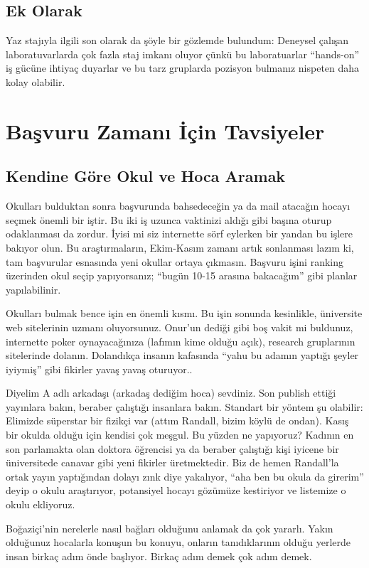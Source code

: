 \documentclass[12pt]{article}
\begin{document}
\subsection{Ek Olarak}
Yaz  stajıyla ilgili son olarak da şöyle bir gözlemde bulundum:  Deneysel çalışan laboratuvarlarda çok fazla staj imkanı oluyor çünkü bu laboratuarlar “hands-on” iş gücüne ihtiyaç duyarlar ve bu tarz gruplarda pozisyon bulmanız nispeten daha kolay olabilir. 
\newpage
%
%
\section{Başvuru Zamanı İçin Tavsiyeler}
%
\subsection{Kendine Göre Okul ve Hoca Aramak}
Okulları bulduktan sonra başvurunda bahsedeceğin ya da mail atacağın hocayı seçmek önemli bir iştir. Bu iki iş uzunca vaktinizi aldığı gibi başına oturup odaklanması da zordur. İyisi mi siz internette sörf eylerken bir yandan bu işlere bakıyor olun. Bu araştırmaların, Ekim-Kasım zamanı artık sonlanması lazım ki, tam başvurular esnasında yeni okullar ortaya çıkmasın. Başvuru işini ranking üzerinden okul seçip yapıyorsanız; “bugün 10-15 arasına bakacağım” gibi planlar yapılabilinir. 

Okulları bulmak bence işin en önemli kısmı. Bu işin sonunda kesinlikle, üniversite web sitelerinin uzmanı oluyorsunuz. Onur'un dediği gibi boş vakit mi buldunuz, internette poker oynayacağınıza (lafımın kime olduğu açık), research gruplarının sitelerinde dolanın. Dolandıkça insanın kafasında ``yahu bu adamın yaptığı şeyler iyiymiş'' gibi fikirler yavaş yavaş oturuyor.. 

Diyelim A adlı arkadaşı (arkadaş dediğim hoca) sevdiniz. Son publish ettiği yayınlara bakın, beraber çalıştığı insanlara bakın. Standart bir yöntem şu olabilir: Elimizde süperstar bir fizikçi var (attım Randall, bizim köylü de ondan). Kasış bir okulda olduğu için kendisi çok meşgul. Bu yüzden ne yapıyoruz? Kadının en son parlamakta olan doktora öğrencisi ya da beraber çalıştığı kişi iyicene bir üniversitede canavar gibi yeni fikirler üretmektedir. Biz de hemen Randall'la ortak yayın yaptığından dolayı zınk diye yakalıyor, “aha ben bu okula da girerim” deyip o okulu araştırıyor, potansiyel hocayı gözümüze kestiriyor ve listemize o okulu ekliyoruz. 

Boğaziçi'nin nerelerle nasıl bağları olduğunu anlamak da çok yararlı. Yakın olduğunuz hocalarla konuşun bu konuyu, onların tanıdıklarının olduğu yerlerde insan birkaç adım önde başlıyor. Birkaç adım demek çok adım demek. 
\end{document}
